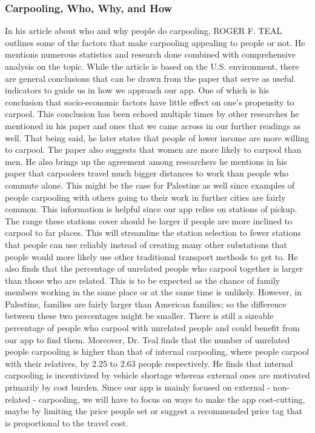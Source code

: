 \documentclass[a4paper, 12pt]{article} %
\begin{document}
            \subsubsection{Carpooling, Who, Why, and How}
                In his article about who and why people do carpooling, ROGER F. TEAL \cite{carpool_who_why_how} outlines some of the factors that make carpooling appealing to people or not. He mentions numerous statistics and research done combined with comprehensive analysis on the topic. While the article is based on the U.S. environment, there are general conclusions that can be drawn from the paper that serve as useful indicators to guide us in how we approach our app. One of which is his conclusion that socio-economic factors have little effect on one's propensity to carpool. This conclusion has been echoed multiple times by other researches he mentioned in his paper and ones that we came across in our further readings as well. That being said, he later states that people of lower income are more willing to carpool. The paper also suggests that women are more likely to carpool than men. He also brings up the agreement among researchers he mentions in his paper that carpoolers travel much bigger distances to work than people who commute alone. This might be the case for Palestine as well since examples of people carpooling with others going to their work in further cities are fairly common. This information is helpful since our app relies on stations of pickup. The range these stations cover should be larger if people are more inclined to carpool to far places. This will streamline the station selection to fewer stations that people can use reliably instead of creating many other substations that people would more likely use other traditional transport methods to get to. He also finds that the percentage of unrelated people who carpool together is larger than those who are related. This is to be expected as the chance of family members working in the same place or at the same time is unlikely. However, in Palestine, families are fairly larger than American families; so the difference between these two percentages might be smaller. There is still a sizeable percentage of people who carpool with unrelated people and could benefit from our app to find them. Moreover, Dr. Teal finds that the number of unrelated people carpooling is higher than that of internal carpooling, where people carpool with their relatives, by 2.25 to 2.63 people respectively. He finds that internal carpooling is incentivized by vehicle shortage whereas external ones are motivated primarily by cost burden.\cite{carpool_who_why_how} Since our app is mainly focused on external - non-related - carpooling, we will have to focus on ways to make the app cost-cutting, maybe by limiting the price people set or suggest a recommended price tag that is proportional to the travel cost.
                
\end{document}

